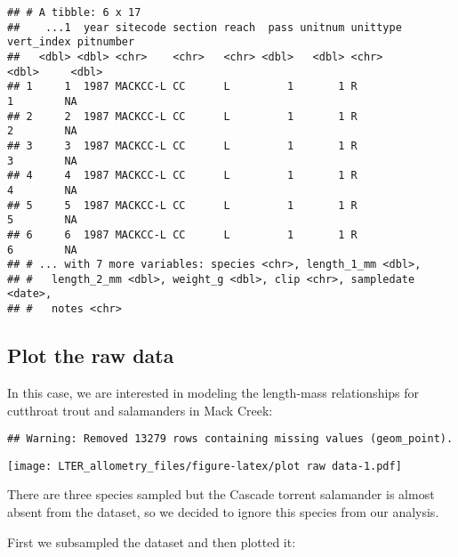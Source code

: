 \documentclass[
]{article}
\newenvironment{Shaded}{\begin{snugshade}}{\end{snugshade}}
\newcommand{\AttributeTok}[1]{\textcolor[rgb]{0.77,0.63,0.00}{#1}}
\newcommand{\FunctionTok}[1]{\textcolor[rgb]{0.00,0.00,0.00}{#1}}
\newcommand{\NormalTok}[1]{#1}
\newcommand{\OtherTok}[1]{\textcolor[rgb]{0.56,0.35,0.01}{#1}}
\newcommand{\SpecialCharTok}[1]{\textcolor[rgb]{0.00,0.00,0.00}{#1}}
\newcommand{\StringTok}[1]{\textcolor[rgb]{0.31,0.60,0.02}{#1}}
\begin{document}
\begin{verbatim}
## # A tibble: 6 x 17
##    ...1  year sitecode section reach  pass unitnum unittype vert_index pitnumber
##   <dbl> <dbl> <chr>    <chr>   <chr> <dbl>   <dbl> <chr>         <dbl>     <dbl>
## 1     1  1987 MACKCC-L CC      L         1       1 R                 1        NA
## 2     2  1987 MACKCC-L CC      L         1       1 R                 2        NA
## 3     3  1987 MACKCC-L CC      L         1       1 R                 3        NA
## 4     4  1987 MACKCC-L CC      L         1       1 R                 4        NA
## 5     5  1987 MACKCC-L CC      L         1       1 R                 5        NA
## 6     6  1987 MACKCC-L CC      L         1       1 R                 6        NA
## # ... with 7 more variables: species <chr>, length_1_mm <dbl>,
## #   length_2_mm <dbl>, weight_g <dbl>, clip <chr>, sampledate <date>,
## #   notes <chr>
\end{verbatim}

\hypertarget{plot-the-raw-data}{%
\subsection{Plot the raw data}\label{plot-the-raw-data}}

In this case, we are interested in modeling the length-mass
relationships for cutthroat trout and salamanders in Mack Creek:

\begin{verbatim}
## Warning: Removed 13279 rows containing missing values (geom_point).
\end{verbatim}

\texttt{[image: LTER\_allometry\_files/figure-latex/plot raw data-1.pdf]}

There are three species sampled but the Cascade torrent salamander is
almost absent from the dataset, so we decided to ignore this species
from our analysis.

First we subsampled the dataset and then plotted it:

\begin{Shaded}
\end{Shaded}
\end{document}
